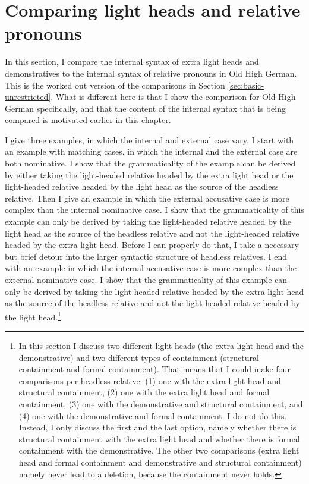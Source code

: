 \section{Comparing light heads and relative pronouns}\label{sec:comparing-ohg}

In this section, I compare the internal syntax of extra light heads and demonstratives to the internal syntax of relative pronouns in Old High German. This is the worked out version of the comparisons in Section \ref{sec:basic-unrestricted}. What is different here is that I show the comparison for Old High German specifically, and that the content of the internal syntax that is being compared is motivated earlier in this chapter.

I give three examples, in which the internal and external case vary.
I start with an example with matching cases, in which the internal and the external case are both nominative. I show that the grammaticality of the example can be derived by either taking the light-headed relative headed by the extra light head or the light-headed relative headed by the light head as the source of the headless relative.
Then I give an example in which the external accusative case is more complex than the internal nominative case. I show that the grammaticality of this example can only be derived by taking the light-headed relative headed by the light head as the source of the headless relative and not the light-headed relative headed by the extra light head. Before I can properly do that, I take a necessary but brief detour into the larger syntactic structure of headless relatives.
I end with an example in which the internal accusative case is more complex than the external nominative case. I show that the grammaticality of this example can only be derived by taking the light-headed relative headed by the extra light head as the source of the headless relative and not the light-headed relative headed by the light head.\footnote{
In this section I discuss two different light heads (the extra light head and the demonstrative) and two different types of containment (structural containment and formal containment). That means that I could make four comparisons per headless relative: (1) one with the extra light head and structural containment, (2) one with the extra light head and formal containment, (3) one with the demonstrative and structural containment, and (4) one with the demonstrative and formal containment. I do not do this. Instead, I only discuss the first and the last option, namely whether there is structural containment with the extra light head and whether there is formal containment with the demonstrative. The other two comparisons (extra light head and formal containment and demonstrative and structural containment) namely never lead to a deletion, because the containment never holds.
}

